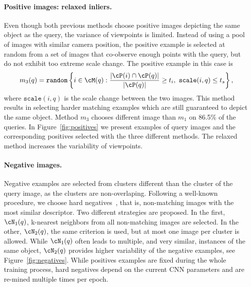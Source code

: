 %

%

\paragraph{Positive images: relaxed inliers.}
%
Even though both previous methods choose positive images depicting the same object as the query, the variance of viewpoints is limited.
Instead of using a pool of images with similar camera position, the positive example is selected at random from a set of images that co-observe enough points with the query, but do not exhibit too extreme scale change. 
The positive example in this case is  
\begin{equation}
\label{equ:relaxed_pos}
m_3(q) = \texttt{random}\left\{ i \in \cM(q): \frac{|\cP(i) \cap \cP(q)|}{|\cP(q)|} \geq t_i,~\texttt{scale}(i,q) \leq t_s \right\},
\end{equation} 
%
where $\texttt{scale}(i,q)$ is the scale change between the two images.
This method results in selecting harder matching examples which are still guaranteed to depict the same object. Method $m_3$ chooses different image than $m_1$ on 86.5\% of the queries.
In Figure~\ref{fig:positives} we present examples of query images and the corresponding positives selected with the three different methods. The relaxed method increases the variability of viewpoints. 
%

\paragraph{Negative images.} 
%
Negative examples are selected from clusters different than the cluster of the query image, as the clusters are non-overlaping. 
Following a well-known procedure, we choose hard negatives~\cite{STFKM14,GDDM14}, that is, non-matching images with the most similar descriptor. Two different strategies are proposed. In the first, $\cN_1(q)$, k-nearest neighbors from all non-matching images are selected. In the other, $\cN_2(q)$, the same criterion is used, but at most one image per cluster is allowed. While $\cN_1(q)$ often leads to multiple, and very similar, instances of the same object, $\cN_2(q)$ provides higher variability of the negative examples, see Figure~\ref{fig:negatives}. While positives examples are fixed during the whole training process, hard negatives depend on the current CNN parameters and are re-mined multiple times per epoch. 

%

%